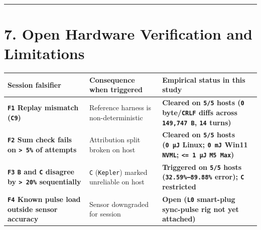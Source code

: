 \documentclass[10pt,letterpaper]{article}
\begin{document}
\begin{center}\rule{0.5\linewidth}{0.5pt}\end{center}

\section{7. Open Hardware Verification and
Limitations}\label{open-hardware-verification-and-limitations}

{\footnotesize\setlength{\tabcolsep}{3.8pt}\renewcommand{\arraystretch}{1.15}
\begin{longtable}[]{@{}
  >{\raggedright\arraybackslash}p{}
  >{\raggedright\arraybackslash}p{}
  >{\raggedright\arraybackslash}p{}@{}}
\toprule\noalign{}
\begin{minipage}[b]{\linewidth}\raggedright
\textbf{Session falsifier}
\end{minipage} & \begin{minipage}[b]{\linewidth}\raggedright
\textbf{Consequence when triggered}
\end{minipage} & \begin{minipage}[b]{\linewidth}\raggedright
\textbf{Empirical status in this study}
\end{minipage} \\
\midrule\noalign{}
\endhead
\bottomrule\noalign{}
\endlastfoot
\textbf{\texttt{F1} Replay mismatch (\texttt{C9})} & Reference harness
is non-deterministic & \textbf{Cleared on \texttt{5/5} hosts (\texttt{0}
byte/\texttt{CRLF} diffs across \texttt{149,\allowbreak{}747\ B}, \texttt{14}
turns)} \\
\textbf{\texttt{F2} Sum check fails on \texttt{\textgreater{}\ 5\%} of
attempts} & Attribution split broken on host & \textbf{Cleared on
\texttt{5/5} hosts (\texttt{0\ µJ} Linux; \texttt{0\ mJ} Win11
\texttt{NVML}; \texttt{\textless{}=\ 1\ µJ} \texttt{M5\ Max})} \\
\textbf{\texttt{F3} \texttt{B} and \texttt{C} disagree by
\texttt{\textgreater{}\ 20\%} sequentially} & \texttt{C}
(\texttt{Kepler}) marked unreliable on host & \textbf{Triggered on
\texttt{5/5} hosts (\texttt{32.\allowbreak{}59\%–89.\allowbreak{}88\%} error); \texttt{C}
restricted} \\
\textbf{\texttt{F4} Known pulse load outside sensor accuracy} & Sensor
downgraded for session & \textbf{Open (\texttt{L0} smart-plug sync-pulse
rig not yet attached)} \\

\end{longtable}}
\end{document}

